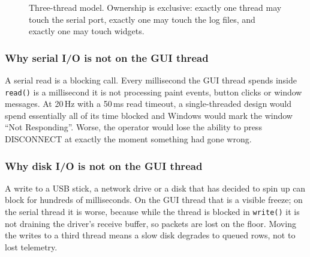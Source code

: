 \documentclass[11pt,a4paper]{article}
\newcommand{\code}[1]{\texttt{#1}}
\begin{document}
\begin{figure}[htbp]
\caption{Three-thread model. Ownership is exclusive: exactly one thread may
touch the serial port, exactly one may touch the log files, and exactly one
may touch widgets.}
\label{fig:threads}
\end{figure}

\subsubsection{Why serial I/O is not on the GUI thread}

A serial read is a blocking call. Every millisecond the GUI thread spends
inside \code{read()} is a millisecond it is not processing paint events,
button clicks or window messages. At 20\,Hz with a 50\,ms read timeout, a
single-threaded design would spend essentially all of its time blocked and
Windows would mark the window ``Not Responding''. Worse, the operator would
lose the ability to press \textsf{DISCONNECT} at exactly the moment something
had gone wrong.

\subsubsection{Why disk I/O is not on the GUI thread}

A write to a USB stick, a network drive or a disk that has decided to spin up
can block for hundreds of milliseconds. On the GUI thread that is a visible
freeze; on the serial thread it is worse, because while the thread is blocked
in \code{write()} it is not draining the driver's receive buffer, so packets
are lost on the floor. Moving the writes to a third thread means a slow disk
degrades to queued rows, not to lost telemetry.
\end{document}
